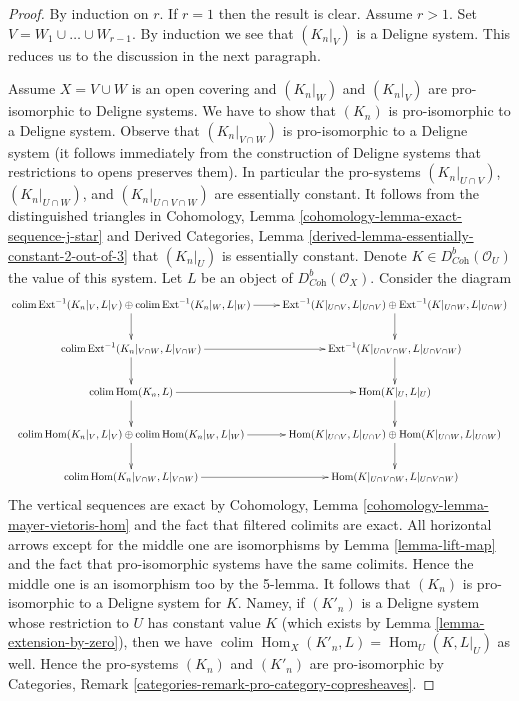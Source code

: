 \documentclass{stacks-project}
\theoremstyle{plain}
\theoremstyle{definition}
\theoremstyle{remark}
\numberwithin{equation}{subsection}
\def\colim{\mathop{\mathrm{colim}}\nolimits}
\def\Hom{\mathop{\mathrm{Hom}}\nolimits}
\def\Ext{\mathop{\mathrm{Ext}}\nolimits}
\begin{document}
\begin{proof}
By induction on $r$. If $r = 1$ then the result is clear.
Assume $r > 1$. Set $V = W_1 \cup \ldots \cup W_{r - 1}$.
By induction we see that $(K_n|_V)$ is a Deligne system.
This reduces us to the discussion in the next paragraph.

\medskip\noindent
Assume $X = V \cup W$ is an open covering and
$(K_n|_W)$ and $(K_n|_V)$ are pro-isomorphic to Deligne systems.
We have to show that $(K_n)$ is pro-isomorphic to a Deligne system.
Observe that $(K_n|_{V \cap W})$ is pro-isomorphic to a Deligne system
(it follows immediately from the construction of Deligne systems
that restrictions to opens preserves them). In particular the pro-systems
$(K_n|_{U \cap V})$,
$(K_n|_{U \cap W})$, and
$(K_n|_{U \cap V \cap W})$
are essentially constant. It follows from the distinguished triangles
in Cohomology, Lemma \ref{cohomology-lemma-exact-sequence-j-star} and
Derived Categories, Lemma \ref{derived-lemma-essentially-constant-2-out-of-3}
that $(K_n|_U)$ is essentially constant.
Denote $K \in D^b_{\textit{Coh}}(\mathcal{O}_U)$ the value of this system.
Let $L$ be an object of $D^b_{\textit{Coh}}(\mathcal{O}_X)$.
Consider the diagram
$$
\xymatrix{
\colim \Ext^{-1}(K_n|_V, L|_V) \oplus
\colim \Ext^{-1}(K_n|_W, L|_W) \ar[r] \ar[d] &
\Ext^{-1}(K|_{U \cap V}, L|_{U \cap V}) \oplus
\Ext^{-1}(K|_{U \cap W}, L|_{U \cap W}) \ar[d] \\
\colim \Ext^{-1}(K_n|_{V \cap W}, L|_{V \cap W}) \ar[r] \ar[d] &
\Ext^{-1}(K|_{U \cap V \cap W}, L|_{U \cap V \cap W}) \ar[d] \\
\colim \Hom(K_n, L) \ar[d] \ar[r] &
\Hom(K|_U, L|_U) \ar[d] \\
\colim \Hom(K_n|_V, L|_V) \oplus \colim \Hom(K_n|_W, L|_W) \ar[r] \ar[d] &
\Hom(K|_{U \cap V}, L|_{U \cap V}) \oplus
\Hom(K|_{U \cap W}, L|_{U \cap W}) \ar[d] \\
\colim \Hom(K_n|_{V \cap W}, L|_{V \cap W}) \ar[r] &
\Hom(K|_{U \cap V \cap W}, L|_{U \cap V \cap W})
}
$$
The vertical sequences are exact by
Cohomology, Lemma \ref{cohomology-lemma-mayer-vietoris-hom}
and the fact that filtered colimits are exact.
All horizontal arrows except for the middle one are isomorphisms
by Lemma \ref{lemma-lift-map} and the fact that pro-isomorphic systems
have the same colimits. Hence the middle one is an isomorphism too by
the 5-lemma. It follows that $(K_n)$ is pro-isomorphic to
a Deligne system for $K$. Namey, if $(K'_n)$ is a Deligne system
whose restriction to $U$ has constant value $K$ (which
exists by Lemma \ref{lemma-extension-by-zero}), then
we have $\colim \Hom_X(K'_n, L) = \Hom_U(K, L|_U)$ as well.
Hence the pro-systems $(K_n)$ and $(K'_n)$ are
pro-isomorphic by
Categories, Remark \ref{categories-remark-pro-category-copresheaves}.
\end{proof}
\end{document}

